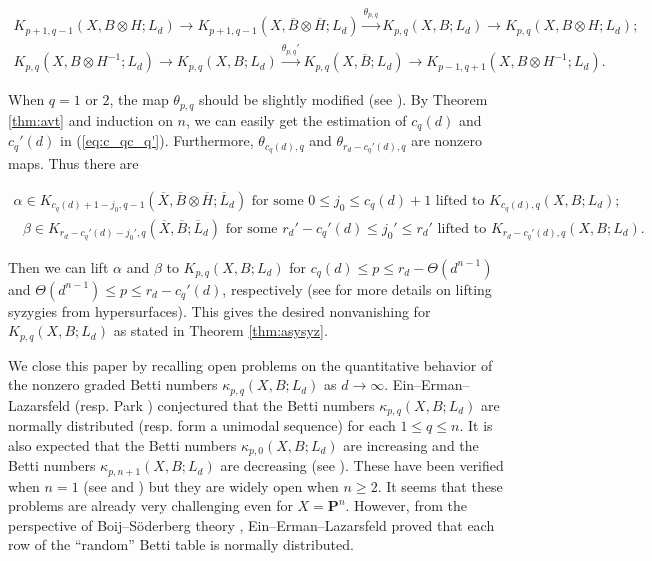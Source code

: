 \documentclass[graybox]{svmult}
\def\nP{\mathbf{P}}
\begin{document}
\begin{scriptsize}
$$
\begin{array}{l}
K_{p+1, q-1}(X, B \otimes H; L_d) \rightarrow K_{p+1, q-1}(X, \overline{B} \otimes \overline{H}; L_d) \xrightarrow{\theta_{p,q}} K_{p,q}(X, B; L_d) \rightarrow K_{p,q}(X, B \otimes H; L_d);\\[3pt]
K_{p,q}(X, B \otimes H^{-1}; L_d) \rightarrow K_{p,q}(X, B; L_d) \xrightarrow{\theta_{p,q}'} K_{p,q}(X, \overline{B}; L_d) \rightarrow K_{p-1, q+1}(X, B \otimes H^{-1}; L_d).
\end{array}
$$
\end{scriptsize}

\noindent When $q=1$ or $2$, the map $\theta_{p,q}$ should be slightly modified (see \cite[Section 3]{Park3}). By Theorem \ref{thm:avt} and induction on $n$, we can easily get the estimation of $c_q(d)$ and $c_q'(d)$ in (\ref{eq:c_qc_q'}). Furthermore, $\theta_{c_q(d), q}$ and $\theta_{r_d-c_q'(d), q}$ are nonzero maps. Thus there are\\[-20pt]

\begin{footnotesize}
$$
\begin{array}{l}
\text{$\alpha \in K_{c_q(d)+1-j_0, q-1}(\overline{X}, \overline{B} \otimes \overline{H}; \overline{L}_d)$ for some $0 \leq j_0 \leq c_q(d)+1$ lifted to $K_{c_q(d),q}(X, B; L_d)$;}\\
\text{ $\beta \in K_{r_d-c_q'(d)-j_0', q}(\overline{X}, \overline{B}; \overline{L}_d)$ for some $r_d' - c_q'(d) \leq j_0' \leq r_d'$ lifted to $K_{r_d-c_q'(d),q}(X, B; L_d)$.}
\end{array}
$$
\end{footnotesize}

\noindent Then we can lift $\alpha$ and $\beta$ to $K_{p,q}(X, B; L_d)$ for $c_q(d) \leq p \leq r_d - \Theta(d^{n-1})$ and $\Theta(d^{n-1}) \leq p \leq r_d-c_q'(d)$, respectively (see \cite[Theorem 3.1]{Park3} for more details on lifting syzygies from hypersurfaces). This gives the desired nonvanishing for $K_{p,q}(X, B; L_d)$ as stated in Theorem \ref{thm:asysyz}.

We close this paper by recalling open problems on the quantitative behavior of the nonzero graded Betti numbers $\kappa_{p,q}(X, B; L_d)$ as $d \to \infty$. Ein--Erman--Lazarsfeld \cite[Conjecture B]{EEL} (resp. Park \cite[Conjecture 5.7]{Park3}) conjectured that the Betti numbers $\kappa_{p,q}(X,B;L_d)$ are normally distributed (resp. form a unimodal sequence) for each $1 \leq q \leq n$. It is also expected that the Betti numbers $\kappa_{p,0}(X,B;L_d)$ are increasing and the Betti numbers $\kappa_{p,n+1}(X,B;L_d)$ are decreasing (see \cite[Remark 5.9]{Park3}). These have been verified when $n=1$ (see \cite[Proposition A]{EEL} and \cite[Proposition 5.8]{Park3}) but they are widely open when $n \geq 2$. It seems that these problems are already very challenging even for $X=\nP^n$. However, from the perspective of Boij--S\"{o}derberg theory \cite{BS, ES}, Ein--Erman--Lazarsfeld \cite[Corollary D]{EEL} proved that each row of the ``random'' Betti table is normally distributed.
\end{document}
